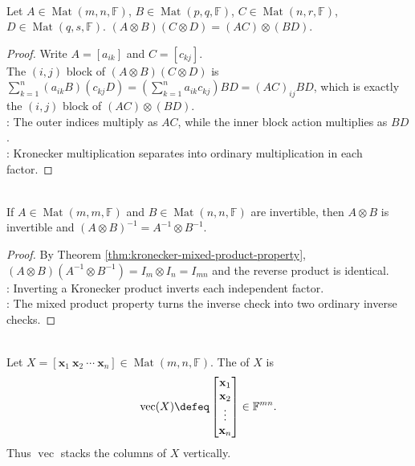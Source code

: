 \begin{theorem} \label{thm:kronecker-mixed-product-property} \\
Let $A\in\operatorname{Mat}(m,n,\mathbb{F})$, $B\in\operatorname{Mat}(p,q,\mathbb{F})$, $C\in\operatorname{Mat}(n,r,\mathbb{F})$, $D\in\operatorname{Mat}(q,s,\mathbb{F})$.  $(A\otimes B)(C\otimes D)=(AC)\otimes(BD)$.
\begin{proof}
Write $A=[a_{ik}]$ and $C=[c_{kj}]$.\\
The $(i,j)$ block of $(A\otimes B)(C\otimes D)$ is $\sum\limits_{k=1}^{n}(a_{ik}B)(c_{kj}D) =\left(\sum\limits_{k=1}^{n}a_{ik}c_{kj}\right)BD =(AC)_{ij}BD$, which is exactly the $(i,j)$ block of $(AC)\otimes(BD)$.\\
: The outer indices multiply as $AC$, while the inner block action multiplies as $BD$.\\
: Kronecker multiplication separates into ordinary multiplication in each factor.
\end{proof}
\end{theorem}

\begin{corollary} \label{cor:inverse-of-kronecker-product} \\
If $A\in\operatorname{Mat}(m,m,\mathbb{F})$ and $B\in\operatorname{Mat}(n,n,\mathbb{F})$ are invertible, then $A\otimes B$ is invertible and $(A\otimes B)^{-1}=A^{-1}\otimes B^{-1}$.
\begin{proof}
By Theorem \ref{thm:kronecker-mixed-product-property}, $(A\otimes B)(A^{-1}\otimes B^{-1})=I_m\otimes I_n=I_{mn}$ and the reverse product is identical.\\
: Inverting a Kronecker product inverts each independent factor.\\
: The mixed product property turns the inverse check into two ordinary inverse checks.
\end{proof}
\end{corollary}

\begin{definition} \label{def:vectorization-map} \\
Let $X=[\mathbf{x}_1\ \mathbf{x}_2\ \cdots\ \mathbf{x}_n]\in\operatorname{Mat}(m,n,\mathbb{F})$. The  of $X$ is
\begin{align}
\operatorname{vec}(X)\defeq
\begin{bmatrix}
\mathbf{x}_1\\
\mathbf{x}_2\\
\vdots\\
\mathbf{x}_n
\end{bmatrix}
\in\mathbb{F}^{mn}.
\nonumber
\end{align}
Thus $\operatorname{vec}$ stacks the columns of $X$ vertically.
\end{definition}

